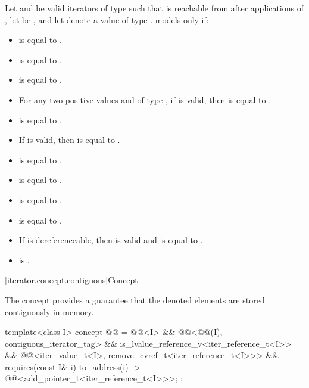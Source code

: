 \pnum
Let  and  be valid iterators of type 
such that  is reachable from 
after  applications of ,
let  be ,
and let  denote a value of type .
 models  only if:
\begin{itemize}
\item {} is equal to .
\item {} is equal to .
\item {} is equal to .
\item For any two positive values
   and  of type ,
  if  is valid, then
   is equal to .
\item {} is equal to .
\item If  is valid, then
   is equal to .
\item {} is equal to .
\item {} is equal to .
\item {} is equal to .
\item {} is equal to .
\item If  is dereferenceable, then
   is valid and is equal to .
\item {} is .
\end{itemize}

[iterator.concept.contiguous]{Concept }

\pnum
The  concept provides a guarantee that
the denoted elements are stored contiguously in memory.

\begin{codeblock}
template<class I>
  concept @@ =
    @@<I> &&
    @@<@@(I), contiguous_iterator_tag> &&
    is_lvalue_reference_v<iter_reference_t<I>> &&
    @@<iter_value_t<I>, remove_cvref_t<iter_reference_t<I>>> &&
    requires(const I& i) {
      { to_address(i) } -> @@<add_pointer_t<iter_reference_t<I>>>;
    };
\end{codeblock}

